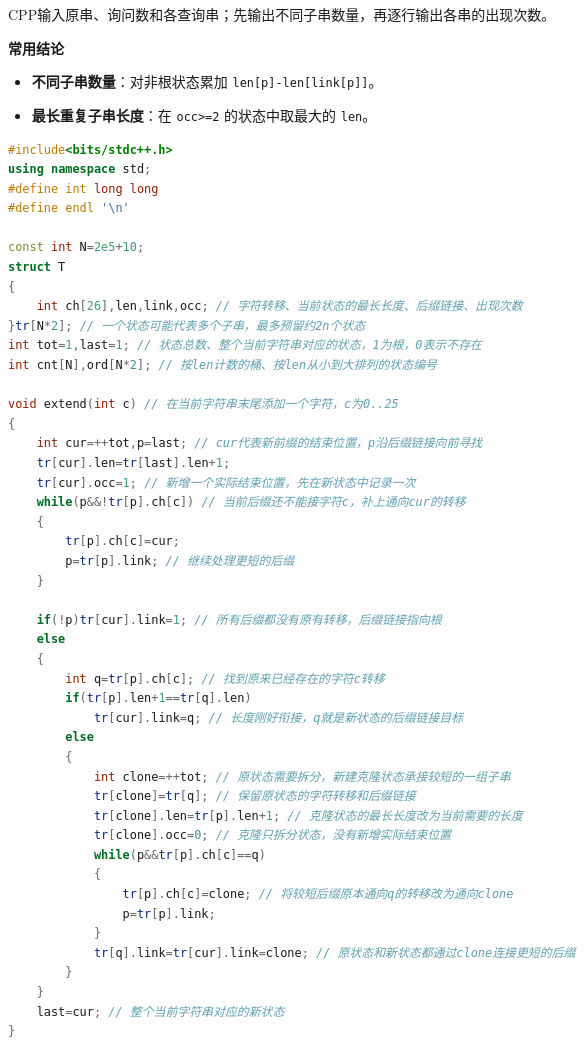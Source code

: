 \documentclass[10pt,landscape,a4paper]{article}
\begin{document}
\begin{multicols*}{3}
CPP输入原串、询问数和各查询串；先输出不同子串数量，再逐行输出各串的出现次数。\par
\par\addvspace{0.7ex}\noindent\textbf{常用结论}\par\nobreak
\begin{itemize}
\item \textbf{不同子串数量}：对非根状态累加 \texttt{l\allowbreak{}e\allowbreak{}n\allowbreak{}[\allowbreak{}p\allowbreak{}]\allowbreak{}-\allowbreak{}l\allowbreak{}e\allowbreak{}n\allowbreak{}[\allowbreak{}l\allowbreak{}i\allowbreak{}n\allowbreak{}k\allowbreak{}[\allowbreak{}p\allowbreak{}]\allowbreak{}]}。
\item \textbf{最长重复子串长度}：在 \texttt{o\allowbreak{}c\allowbreak{}c\allowbreak{}\textgreater{}\allowbreak{}=\allowbreak{}2} 的状态中取最大的 \texttt{l\allowbreak{}e\allowbreak{}n}。
\end{itemize}
\par{}\par
\begin{lstlisting}[language=C++]
#include<bits/stdc++.h>
using namespace std;
#define int long long
#define endl '\n'

const int N=2e5+10;
struct T
{
    int ch[26],len,link,occ; // 字符转移、当前状态的最长长度、后缀链接、出现次数
}tr[N*2]; // 一个状态可能代表多个子串，最多预留约2n个状态
int tot=1,last=1; // 状态总数、整个当前字符串对应的状态，1为根，0表示不存在
int cnt[N],ord[N*2]; // 按len计数的桶、按len从小到大排列的状态编号

void extend(int c) // 在当前字符串末尾添加一个字符，c为0..25
{
    int cur=++tot,p=last; // cur代表新前缀的结束位置，p沿后缀链接向前寻找
    tr[cur].len=tr[last].len+1;
    tr[cur].occ=1; // 新增一个实际结束位置，先在新状态中记录一次
    while(p&&!tr[p].ch[c]) // 当前后缀还不能接字符c，补上通向cur的转移
    {
        tr[p].ch[c]=cur;
        p=tr[p].link; // 继续处理更短的后缀
    }

    if(!p)tr[cur].link=1; // 所有后缀都没有原有转移，后缀链接指向根
    else
    {
        int q=tr[p].ch[c]; // 找到原来已经存在的字符c转移
        if(tr[p].len+1==tr[q].len)
            tr[cur].link=q; // 长度刚好衔接，q就是新状态的后缀链接目标
        else
        {
            int clone=++tot; // 原状态需要拆分，新建克隆状态承接较短的一组子串
            tr[clone]=tr[q]; // 保留原状态的字符转移和后缀链接
            tr[clone].len=tr[p].len+1; // 克隆状态的最长长度改为当前需要的长度
            tr[clone].occ=0; // 克隆只拆分状态，没有新增实际结束位置
            while(p&&tr[p].ch[c]==q)
            {
                tr[p].ch[c]=clone; // 将较短后缀原本通向q的转移改为通向clone
                p=tr[p].link;
            }
            tr[q].link=tr[cur].link=clone; // 原状态和新状态都通过clone连接更短的后缀
        }
    }
    last=cur; // 整个当前字符串对应的新状态
}


\end{lstlisting}
\end{multicols*}
\end{document}
